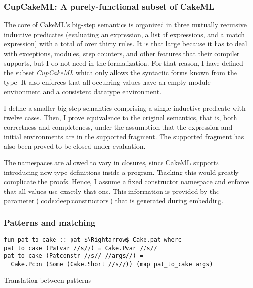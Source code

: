 \subsubsection{CupCakeML: A purely-functional subset of CakeML}
\label{sec:intermediate:cakeml:cupcake}

The core of CakeML's big-step semantics is organized in three mutually recursive inductive predicates (evaluating an expression, a list of expressions, and a match expression) with a total of over thirty rules.
It is that large because it has to deal with exceptions, modules, step counters, and other features that their compiler supports, but I do not need in the formalization.
For that reason, I have defined the subset \emph{CupCakeML} which only allows the syntactic forms known from the  type.
It also enforces that all occurring values have an empty module environment and a consistent datatype environment.

I define a smaller big-step semantics comprising a single inductive predicate with twelve cases.
Then, I prove equivalence to the original semantics, that is, both correctness and completeness, under the assumption that the expression and initial environments are in the supported fragment.
The supported fragment has also been proved to be closed under evaluation.

The namespaces are allowed to vary in closures, since CakeML supports introducing new type definitions inside a program.
Tracking this would greatly complicate the proofs.
Hence, I assume a fixed constructor namespace and enforce that all values use exactly that one.
This information is provided by the  parameter (\cref{code:deep:constructors}) that is generated during embedding.

\subsubsection{Patterns and matching}

\begin{code}
  \begin{lstlisting}[language=Isabelle]
fun pat_to_cake :: pat $\Rightarrow$ Cake.pat where
pat_to_cake (Patvar //s//) = Cake.Pvar //s//
pat_to_cake (Patconstr //s// //args//) =
  Cake.Pcon (Some (Cake.Short //s//)) (map pat_to_cake args)\end{lstlisting}
  \caption{Translation between patterns}
  \label{code:intermediate:cakeml:pat}
\end{code}

